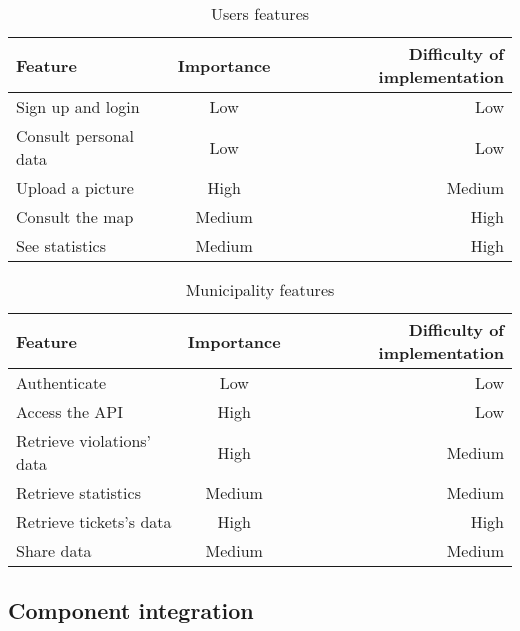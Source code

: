         \begin{table}[h!]
            \begin{center}
            
            \begin{tabular}{l|c|r} %
                \textbf{Feature} & \textbf{Importance} & \textbf{Difficulty of implementation}\\
                
                \hline
                Sign up and login & Low & Low\\
                Consult personal data & Low & Low\\
                Upload a picture & High & Medium\\
                Consult the map & Medium & High\\
                See statistics & Medium & High\\

            \end{tabular}
            \caption{Users features}
            \label{tab:table1}
            \end{center}
        \end{table}


      
        \begin{table}[h!]
            \begin{center}
            
            \begin{tabular}{l|c|r} %
                \textbf{Feature} & \textbf{Importance} & \textbf{Difficulty of implementation}\\
                
                \hline
                Authenticate & Low & Low\\
                Access the API & High & Low\\
                Retrieve violations' data & High & Medium\\
                Retrieve statistics & Medium & Medium\\
                Retrieve tickets's data & High & High\\
                Share data & Medium & Medium\\

            \end{tabular}
            \caption{Municipality features}
            \label{tab:table1}
            \end{center}
        \end{table}

    \subsection{Component integration}

